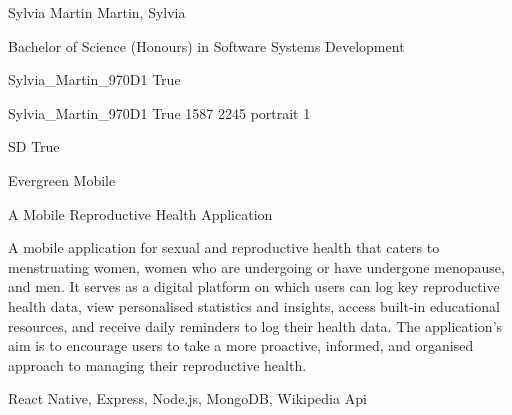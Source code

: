 \documentclass[twoside]{report}
\begin{document}
\begingroup{}\relax



\def\Key{Sylvia_Martin_970D1}

{Sylvia Martin}
{Martin, Sylvia}

{Bachelor of Science (Honours) in Software Systems Development}

{Sylvia_Martin_970D1}
{True}

{Sylvia_Martin_970D1}
{True}
{1587}
{2245}
{portrait}
{1}

{SD}
{True}

{Evergreen Mobile}

{A Mobile Reproductive Health Application}

{A mobile application for sexual and reproductive health that caters to menstruating women, women who are undergoing or have undergone menopause, and men. It serves as a digital platform on which users can log key reproductive health data, view personalised statistics and insights, access built-in educational resources, and receive daily reminders to log their health data. The application's aim is to encourage users to take a more proactive, informed, and organised approach to managing their reproductive health.}

{React Native, Express, Node.js, MongoDB, Wikipedia Api}
\end{document}
